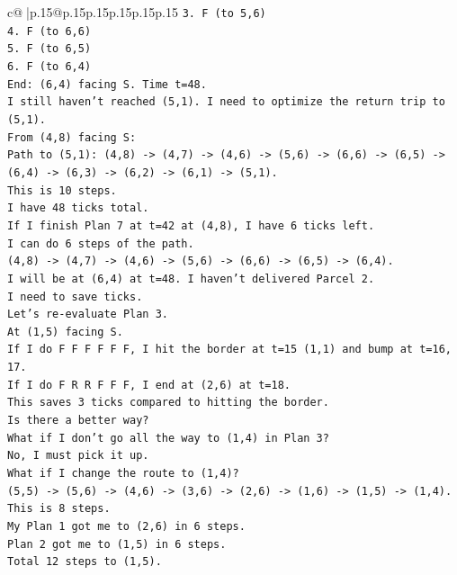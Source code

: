 \documentclass{article}
\begin{document}
{\begin{supertabular}{c@{$\;$}|p{.15\linewidth}@{}p{.15\linewidth}p{.15\linewidth}p{.15\linewidth}p{.15\linewidth}p{.15\linewidth}}
{{{\texttt{3. F (to 5,6)} \\
\texttt{4. F (to 6,6)} \\
\texttt{5. F (to 6,5)} \\
\texttt{6. F (to 6,4)} \\
\texttt{End: (6,4) facing S. Time t=48.} \\
\texttt{I still haven't reached (5,1). I need to optimize the return trip to (5,1).} \\
\texttt{From (4,8) facing S:} \\
\texttt{Path to (5,1): (4,8) {-}> (4,7) {-}> (4,6) {-}> (5,6) {-}> (6,6) {-}> (6,5) {-}> (6,4) {-}> (6,3) {-}> (6,2) {-}> (6,1) {-}> (5,1).} \\
\texttt{This is 10 steps.} \\
\texttt{I have 48 ticks total.} \\
\texttt{If I finish Plan 7 at t=42 at (4,8), I have 6 ticks left.} \\
\texttt{I can do 6 steps of the path.} \\
\texttt{(4,8) {-}> (4,7) {-}> (4,6) {-}> (5,6) {-}> (6,6) {-}> (6,5) {-}> (6,4).} \\
\texttt{I will be at (6,4) at t=48. I haven't delivered Parcel 2.} \\
\texttt{I need to save ticks.} \\
\texttt{Let's re{-}evaluate Plan 3.} \\
\texttt{At (1,5) facing S.} \\
\texttt{If I do F F F F F F, I hit the border at t=15 (1,1) and bump at t=16, 17.} \\
\texttt{If I do F R R F F F, I end at (2,6) at t=18.} \\
\texttt{This saves 3 ticks compared to hitting the border.} \\
\texttt{Is there a better way?} \\
\texttt{What if I don't go all the way to (1,4) in Plan 3?} \\
\texttt{No, I must pick it up.} \\
\texttt{What if I change the route to (1,4)?} \\
\texttt{(5,5) {-}> (5,6) {-}> (4,6) {-}> (3,6) {-}> (2,6) {-}> (1,6) {-}> (1,5) {-}> (1,4).} \\
\texttt{This is 8 steps.} \\
\texttt{My Plan 1 got me to (2,6) in 6 steps.} \\
\texttt{Plan 2 got me to (1,5) in 6 steps.} \\
\texttt{Total 12 steps to (1,5).} \\
}}}
\end{supertabular}}
\end{document}
